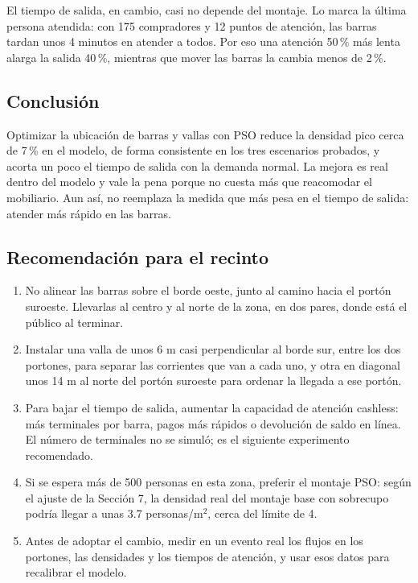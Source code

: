 \documentclass[11pt,letterpaper]{article}
\begin{document}
El tiempo de salida, en cambio, casi no depende del montaje. Lo marca la última persona atendida: con 175 compradores y 12 puntos de atención, las barras tardan unos 4 minutos en atender a todos. Por eso una atención 50\,\% más lenta alarga la salida 40\,\%, mientras que mover las barras la cambia menos de 2\,\%.

\subsection{Conclusión}
Optimizar la ubicación de barras y vallas con PSO reduce la densidad pico cerca de 7\,\% en el modelo, de forma consistente en los tres escenarios probados, y acorta un poco el tiempo de salida con la demanda normal. La mejora es real dentro del modelo y vale la pena porque no cuesta más que reacomodar el mobiliario. Aun así, no reemplaza la medida que más pesa en el tiempo de salida: atender más rápido en las barras.

\subsection{Recomendación para el recinto}
\begin{enumerate}
\item No alinear las barras sobre el borde oeste, junto al camino hacia el portón suroeste. Llevarlas al centro y al norte de la zona, en dos pares, donde está el público al terminar.
\item Instalar una valla de unos 6 m casi perpendicular al borde sur, entre los dos portones, para separar las corrientes que van a cada uno, y otra en diagonal unos 14 m al norte del portón suroeste para ordenar la llegada a ese portón.
\item Para bajar el tiempo de salida, aumentar la capacidad de atención cashless: más terminales por barra, pagos más rápidos o devolución de saldo en línea. El número de terminales no se simuló; es el siguiente experimento recomendado.
\item Si se espera más de 500 personas en esta zona, preferir el montaje PSO: según el ajuste de la Sección 7, la densidad real del montaje base con sobrecupo podría llegar a unas 3.7 personas/m$^2$, cerca del límite de 4.
\item Antes de adoptar el cambio, medir en un evento real los flujos en los portones, las densidades y los tiempos de atención, y usar esos datos para recalibrar el modelo.
\end{enumerate}
\end{document}
